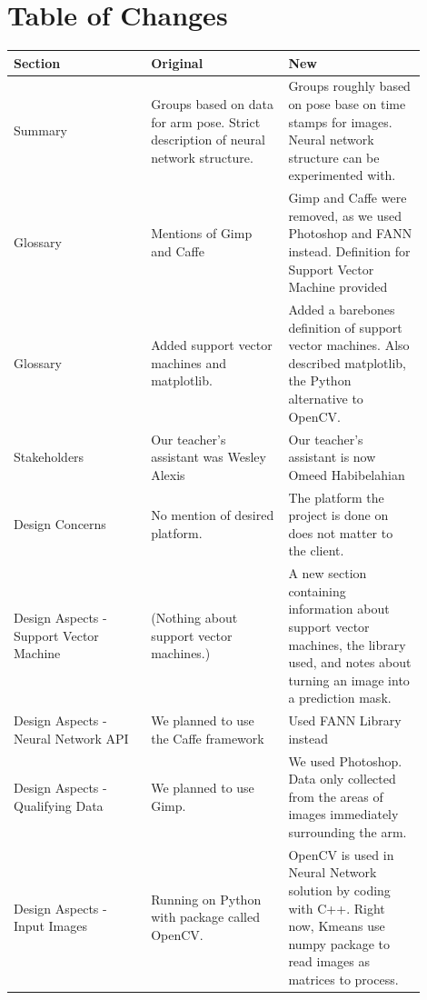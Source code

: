 \documentclass[10pt,journal,compsoc, draftclsnofoot,onecolumn]{IEEEtran}
\begin{document}
\section{Table of Changes}
\begin{center}
 \begin{tabular}{|p{0.3\linewidth}|p{0.3\linewidth}|p{0.3\linewidth}|}
  \hline
 Section & Original & New \\ [0.5ex]
 \hline\hline

Summary
&
Groups based on data for arm pose.
Strict description of neural network structure.
&
Groups roughly based on pose base on time stamps for images.
Neural network structure can be experimented with.
\\ \hline

Glossary
&
Mentions of Gimp and Caffe
&
Gimp and Caffe were removed, as we used Photoshop and FANN instead.
Definition for Support Vector Machine provided
\\ \hline

Glossary
&
Added support vector machines and matplotlib.
&
Added a barebones definition of support vector machines.
Also described matplotlib, the Python alternative to OpenCV.
\\ \hline

Stakeholders
&
Our teacher's assistant was Wesley Alexis
&
Our teacher's assistant is now Omeed Habibelahian
\\ \hline

Design Concerns
&
No mention of desired platform.
&
The platform the project is done on does not matter to the client.
\\ \hline

Design Aspects - Support Vector Machine
&
(Nothing about support vector machines.)
&
A new section containing information about support vector machines, the library used, and notes about turning an image into a prediction mask.
\\ \hline

Design Aspects - Neural Network API
&
We planned to use the Caffe framework
&
Used FANN Library instead
\\ \hline

Design Aspects - Qualifying Data
&
We planned to use Gimp.
&
We used Photoshop.
Data only collected from the areas of images immediately surrounding the arm.
\\ \hline

Design Aspects - Input Images
&
Running on Python with package called OpenCV.
&
OpenCV is used in Neural Network solution by coding with C++. Right now, Kmeans use numpy package to read images as matrices to process.
\\ \hline

\end{tabular}
\end{center}
\end{document}
